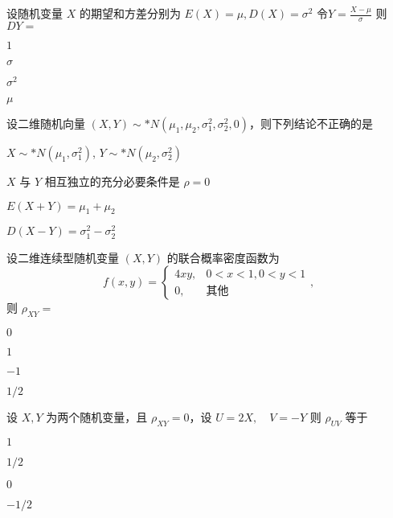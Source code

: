 \documentclass{exam-zh}
\begin{document}
\begin{question}
  设随机变量 $X$ 的期望和方差分别为
  $E(X) = \mu, D(X) = \sigma^2$
  令$Y = \frac{X - \mu}{\sigma}$
  则$DY = $
  \paren[A]
  \begin{choices}
    \item $1$
    \item $\sigma$
    \item $\sigma^2$
    \item $\mu$
  \end{choices}
\end{question}

\begin{question}
  设二维随机向量 $(X, Y) \sim* N(\mu_1, \mu_2, \sigma_1^2, \sigma_2^2, 0)$，则下列结论不正确的是 \paren[D]
  \begin{choices}
    \item $X \sim* N(\mu_1, \sigma_1^2)$, $Y \sim* N(\mu_2, \sigma_2^2)$
    \item $X$ 与 $Y$ 相互独立的充分必要条件是 $\rho = 0$
    \item $E(X + Y) = \mu_1 + \mu_2$
    \item $D(X - Y) = \sigma_1^2 - \sigma_2^2$
  \end{choices}
\end{question}

\begin{question}
  设二维连续型随机变量 $(X, Y)$ 的联合概率密度函数为
  $$
  f(x, y) =
  \begin{cases} 
  4xy, & 0 < x < 1, 0 < y < 1 \\
  0, & \text{其他}
  \end{cases},
  $$
  则 $\rho_{XY} =$ \paren[A]
  \begin{choices}
    \item $0$
    \item $1$
    \item $-1$
    \item $1/2$
  \end{choices}
\end{question}

\begin{question}
  设 $X, Y$ 为两个随机变量，且 $\rho_{XY} = 0$，设
  $U = 2X, \quad V = -Y$
  则 $\rho_{UV}$ 等于 \paren[C]
  \begin{choices}
    \item $1$
    \item $1/2$
    \item $0$
    \item $-1/2$
  \end{choices}
\end{question}
\end{document}
